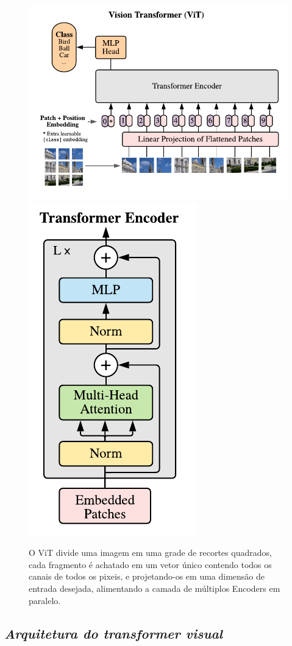 \begin{figure}[!ht]
    \centering
    \includegraphics[width=0.65\columnwidth]{
        Imagens/vit.png
    }
    \includegraphics[width=0.34\columnwidth]{
        Imagens/encoder.png
    }
    \caption{O ViT divide uma imagem em uma grade de recortes quadrados, cada fragmento é achatado em um vetor único contendo todos os canais de todos os pixeis, e projetando-os em uma dimensão de entrada desejada, alimentando a camada de múltiplos Encoders em paralelo. \cite{dosovitskiy2020image}}
    \label{fig:vit}
\end{figure}


\subsection{\textit{Arquitetura do \textit{transformer} visual}}\label{sec:Cap2_vit}

% 

